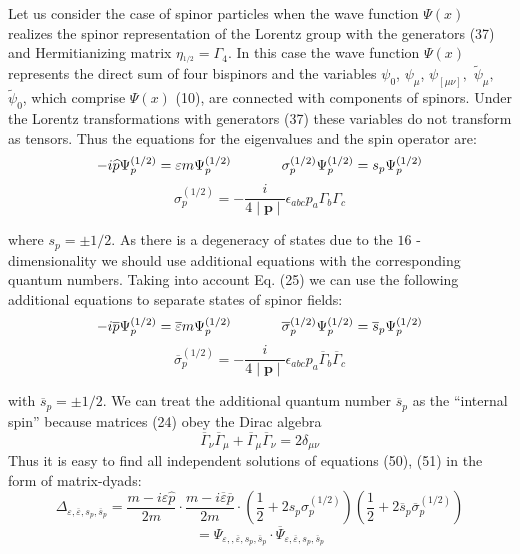 \documentclass[a4paper,12pt]{article}
\begin{document}
Let us consider the case of spinor particles when the wave
function $\Psi (x) $ realizes the spinor representation of the
Lorentz group with the generators (37) and Hermitianizing matrix
$\eta _{^{1/2}}=\Gamma _4$. In this case the wave function $\Psi
(x)$ represents the direct sum of four bispinors and the variables
$\psi _0$, $\psi _\mu $, $\psi _{[\mu \nu ]},$ $ \widetilde{\psi
}_\mu ,$ $\widetilde{\psi }_0$, which comprise $\Psi (x)$ (10),
are connected with components of spinors. Under the Lorentz
transformations with generators (37) these variables do not
transform as tensors. Thus the equations for the eigenvalues and
the spin operator are:
\[
-i\widehat{p}\Psi _p^{(1/2)}=\varepsilon m\Psi
_p^{(1/2)}\hspace{0.5in} \sigma _p^{(1/2)}\Psi _p^{(1/2)}=s_p\Psi
_p^{(1/2)}
\]
\begin{equation}
\sigma _p^{(1/2)}=-\frac i{4\mid \mathbf{p}\mid }\epsilon _{abc}p_a\Gamma
_b\Gamma _c  \label{50}
\end{equation}

where $s_p=\pm 1/2$. As there is a degeneracy of states due to the $16$ -
dimensionality we should use additional equations with the corresponding
quantum numbers. Taking into account Eq. (25) we can use the following
additional equations to separate states of spinor fields:
\[
-i\overline{p}\Psi _p^{(1/2)}=\overline{\varepsilon }m\Psi
_p^{(1/2)} \hspace{0.5in}\overline{\sigma }_p^{(1/2)}\Psi
_p^{(1/2)}=\overline{s}_p\Psi _p^{(1/2)}
\]
\begin{equation}
\overline{\sigma }_p^{(1/2)}=-\frac i{4\mid \mathbf{p}\mid }\epsilon
_{abc}p_a\overline{\Gamma }_b\overline{\Gamma }_c  \label{51}
\end{equation}

with $\overline{s}_p=\pm 1/2$. We can treat the additional quantum
number $ \overline{s}_p$ as the ``internal spin'' because matrices
(24) obey the Dirac algebra
\begin{equation}
\overline{\Gamma }_\nu \overline{\Gamma }_\mu +\overline{\Gamma
}_\mu \overline{\Gamma }_\nu =2\delta _{\mu \nu }  \label{52}
\end{equation}
Thus it is easy to find all independent solutions of equations (50), (51) in
the form of matrix-dyads:
\[
\Delta _{\varepsilon ,\overline{\varepsilon
},s_p,\overline{s}_p}=\frac{ m-i\varepsilon \widehat{p}}{2m}\cdot
\frac{m-i\overline{\varepsilon } \overline{p}}{2m}\cdot \left(
\frac 12+2s_p\sigma _p^{(1/2)}\right) \left( \frac
12+2\overline{s}_p\overline{\sigma }_p^{(1/2)}\right)
\]
\begin{equation}
=\Psi _{\varepsilon ,,\overline{\varepsilon },s_p,\overline{s}_p}\cdot
\overline{\Psi }_{\varepsilon ,\overline{\varepsilon },s_p,\overline{s}_p}
\label{53}
\end{equation}
\end{document}
